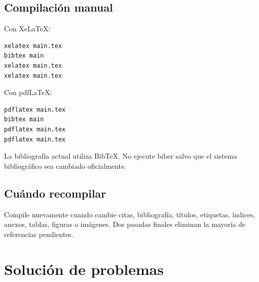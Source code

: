 \documentclass[12pt,a4paper,oneside]{report}
\begin{document}
\section{Compilación manual}

Con XeLaTeX:

\begin{lstlisting}
xelatex main.tex
bibtex main
xelatex main.tex
xelatex main.tex
\end{lstlisting}

Con pdfLaTeX:

\begin{lstlisting}
pdflatex main.tex
bibtex main
pdflatex main.tex
pdflatex main.tex
\end{lstlisting}

La bibliografía actual utiliza BibTeX. No ejecute biber salvo que el sistema bibliográfico sea cambiado oficialmente.

\section{Cuándo recompilar}

Compile nuevamente cuando cambie citas, bibliografía, títulos, etiquetas, índices, anexos, tablas, figuras o imágenes. Dos pasadas finales eliminan la mayoría de referencias pendientes.

\chapter{Solución de problemas}
\end{document}

